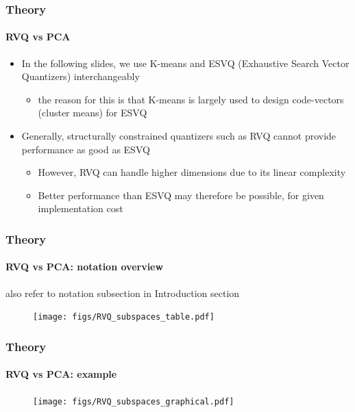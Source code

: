\begin{frame}
\frametitle{Theory}
\framesubtitle{RVQ vs PCA}
\logoCSIPCPL\mypagenum
	\begin{itemize}
		\item In the following slides, we use K-means and ESVQ (Exhaustive Search Vector Quantizers) interchangeably
			\begin{itemize}
				\item the reason for this is that K-means is largely used to design code-vectors (cluster means) for ESVQ
			\end{itemize}
		\item Generally, structurally constrained quantizers such as RVQ cannot provide performance as good as ESVQ
			\begin{itemize}
				\item However, RVQ can handle higher dimensions due to its linear complexity
				\item Better performance than ESVQ may therefore be possible, for given implementation cost
			\end{itemize}
	\end{itemize}
\end{frame}



\begin{frame}
\frametitle{Theory}
\framesubtitle{RVQ vs PCA: notation overview}
\mypagenum
	{\tiny also refer to notation subsection in Introduction section}
	\begin{figure}
		\texttt{[image: figs/RVQ\_subspaces\_table.pdf]}
	\end{figure}	
\end{frame}

\begin{frame}
\frametitle{Theory}
\framesubtitle{RVQ vs PCA: example}
\mypagenum
	\begin{figure}
		\texttt{[image: figs/RVQ\_subspaces\_graphical.pdf]}
	\end{figure}	
\end{frame}

